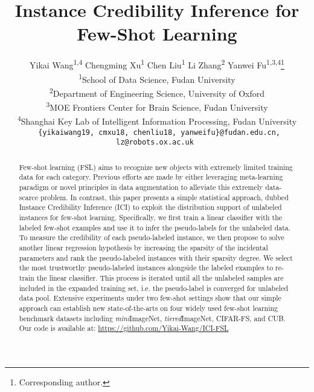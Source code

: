 \documentclass[10pt,letterpaper,twocolumn]{article}
\begin{document}
\title{Instance Credibility Inference for Few-Shot Learning}
\author{Yikai Wang\textsuperscript{1,4}\qquad 
Chengming Xu\textsuperscript{1}\qquad 
Chen Liu\textsuperscript{1}\qquad 
Li Zhang\textsuperscript{2}\qquad 
Yanwei Fu\textsuperscript{1,3,4}\thanks{Corresponding author.}\\
\textsuperscript{1}School of Data Science, Fudan University\\
\textsuperscript{2}Department of Engineering Science, University of Oxford\\
\textsuperscript{3}MOE Frontiers Center for Brain Science, Fudan University\\
\textsuperscript{4}Shanghai Key Lab of
Intelligent Information Processing, Fudan University\\
{\tt\small 
\{yikaiwang19, cmxu18, chenliu18, yanweifu\}@fudan.edu.cn,
lz@robots.ox.ac.uk
}
}
 
 
\maketitle
\begin{abstract}
Few-shot learning (FSL) aims to recognize new objects with extremely limited training data for each category. 
Previous efforts are made by either leveraging meta-learning paradigm or novel principles in data augmentation to alleviate this extremely data-scarce problem. 
In contrast, 
this paper presents a simple statistical approach, 
dubbed Instance Credibility Inference (ICI) to exploit the distribution support of unlabeled instances for few-shot learning. 
Specifically, 
we first train a linear classifier with the labeled few-shot examples and use it to infer the pseudo-labels for the unlabeled data. 
To measure the credibility of each pseudo-labeled instance, 
we then propose to solve another linear regression hypothesis by increasing the sparsity of the incidental parameters and rank the pseudo-labeled instances with their sparsity degree. 
We select the most trustworthy pseudo-labeled instances alongside the labeled examples to re-train the linear classifier. 
This process is iterated until all the unlabeled samples are included in the expanded training set, 
i.e. the pseudo-label is converged for unlabeled data pool.
Extensive experiments under two few-shot settings show that our simple approach can establish new state-of-the-arts on four widely used few-shot learning benchmark datasets including \textit{mini}ImageNet, \textit{tiered}ImageNet, CIFAR-FS, and CUB. 
Our code is available at: \url{https://github.com/Yikai-Wang/ICI-FSL}
\end{abstract}
\end{document}

